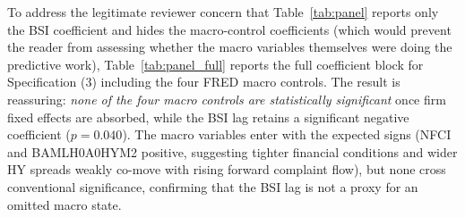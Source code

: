 \documentclass[11pt,a4paper]{article}
\begin{document}
To address the legitimate reviewer concern that Table~\ref{tab:panel} reports only the BSI coefficient and hides the macro-control coefficients (which would prevent the reader from assessing whether the macro variables themselves were doing the predictive work), Table~\ref{tab:panel_full} reports the full coefficient block for Specification (3) including the four FRED macro controls. The result is reassuring: \emph{none of the four macro controls are statistically significant} once firm fixed effects are absorbed, while the BSI lag retains a significant negative coefficient ($p = 0.040$). The macro variables enter with the expected signs (NFCI and BAMLH0A0HYM2 positive, suggesting tighter financial conditions and wider HY spreads weakly co-move with rising forward complaint flow), but none cross conventional significance, confirming that the BSI lag is not a proxy for an omitted macro state.
\end{document}
